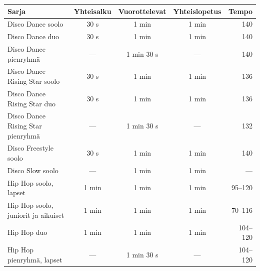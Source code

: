 \documentclass[12pt, a4paper, oneside]{article}
\begin{document}
\begin{table}[ht]
    \centering
    \setlength\tabcolsep{8pt}
    \small
    \renewcommand{\arraystretch}{1.5}
    \begin{tabular}{@{\hspace{0.1cm}}lcccr@{\hspace{0.1cm}}}
        \toprule
        \textbf{Sarja}                             & \textbf{Yhteisalku} & \textbf{Vuorottelevat} & \textbf{Yhteislopetus} & \textbf{Tempo} \\ \midrule
        Disco Dance soolo                          & 30 s                & 1 min                  & 1 min                  & 140            \\
        Disco Dance duo                            & 30 s                & 1 min                  & 1 min                  & 140            \\
        Disco Dance pienryhmä                      & ---                 & 1 min 30 s             & ---                    & 140            \\
        Disco Dance Rising Star soolo              & 30 s                & 1 min                  & 1 min                  & 136            \\
        Disco Dance Rising Star duo                & 30 s                & 1 min                  & 1 min                  & 136            \\
        Disco Dance Rising Star pienryhmä          & ---                 & 1 min 30 s             & ---                    & 132            \\
        Disco Freestyle soolo                      & 30 s                & 1 min                  & 1 min                  & 140            \\
        Disco Slow soolo                           & ---                 & 1 min                  & 1 min                  & ---            \\ \midrule
        Hip Hop soolo, lapset                      & 1 min               & 1 min                  & 1 min                  & 95--120        \\
        Hip Hop soolo, juniorit ja aikuiset        & 1 min               & 1 min                  & 1 min                  & 70--116        \\
        Hip Hop duo                                & 1 min               & 1 min                  & 1 min                  & 104--120       \\
        Hip Hop pienryhmä, lapset                  & ---                 & 1 min 30 s             & ---                    & 104--120       \\

\end{tabular}
\end{table}
\end{document}
